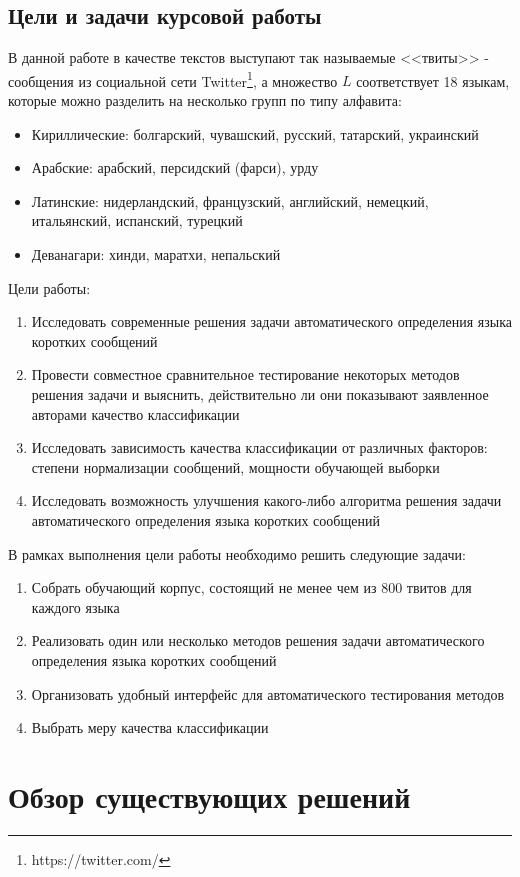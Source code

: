\documentclass[a4paper, 14pt]{article}
\begin{document}
		\subsection{Цели и задачи курсовой работы}
		В данной работе в качестве текстов выступают так называемые <<твиты>> - сообщения из социальной сети Twitter\footnote{https://twitter.com/}, 
		а множество $L$ соответствует 18 языкам, которые можно разделить на несколько групп по типу алфавита:
		\begin{itemize}
			\item Кириллические: болгарский, чувашский, русский, татарский, украинский
			\item Арабские: арабский, персидский (фарси), урду
			\item Латинские: нидерландский, французский, английский, немецкий, итальянский, испанский, турецкий
			\item Деванагари: хинди, маратхи, непальский
		\end{itemize}
		Цели работы:
		\begin{enumerate}
			\item Исследовать современные решения задачи автоматического определения языка коротких сообщений
			\item Провести совместное сравнительное тестирование некоторых методов решения задачи и выяснить, действительно ли они показывают
			заявленное авторами качество классификации
			\item Исследовать зависимость качества классификации от различных факторов: степени нормализации сообщений, мощности обучающей 
			выборки
			\item Исследовать возможность улучшения какого-либо алгоритма решения задачи автоматического определения языка коротких сообщений	
		\end{enumerate}
		В рамках выполнения цели работы необходимо решить следующие задачи:
		\begin{enumerate}
			\item Собрать обучающий корпус, состоящий не менее чем из 800 твитов для каждого языка
			\item Реализовать один или несколько методов решения задачи автоматического определения языка коротких сообщений
			\item Организовать удобный интерфейс для автоматического тестирования методов
			\item Выбрать меру качества классификации
		\end{enumerate}

\section{Обзор существующих решений}
\end{document}
